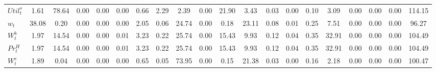 \begin{center}
\begin{longtable}{lccccccccccccccccccc}
$  Util^s_t                 $	 & 	                1.61	 & 	               78.64	 & 	                0.00	 & 	                0.00	 & 	                0.00	 & 	                0.66	 & 	                2.29	 & 	                2.39	 & 	                0.00	 & 	               21.90	 & 	                3.43	 & 	                0.03	 & 	                0.00	 & 	                0.10	 & 	                3.09	 & 	                0.00	 & 	                0.00	 & 	                0.00	 & 	              114.15 \\ 
$ w_t                       $	 & 	               38.08	 & 	                0.20	 & 	                0.00	 & 	                0.00	 & 	                0.00	 & 	                2.05	 & 	                0.06	 & 	               24.74	 & 	                0.00	 & 	                0.18	 & 	               23.11	 & 	                0.08	 & 	                0.01	 & 	                0.25	 & 	                7.51	 & 	                0.00	 & 	                0.00	 & 	                0.00	 & 	               96.27 \\ 
$ W^b_t                     $	 & 	                1.97	 & 	               14.54	 & 	                0.00	 & 	                0.00	 & 	                0.01	 & 	                3.23	 & 	                0.22	 & 	               25.74	 & 	                0.00	 & 	               15.43	 & 	                9.93	 & 	                0.12	 & 	                0.04	 & 	                0.35	 & 	               32.91	 & 	                0.00	 & 	                0.00	 & 	                0.00	 & 	              104.49 \\ 
$ Pr^H_t                    $	 & 	                1.97	 & 	               14.54	 & 	                0.00	 & 	                0.00	 & 	                0.01	 & 	                3.23	 & 	                0.22	 & 	               25.74	 & 	                0.00	 & 	               15.43	 & 	                9.93	 & 	                0.12	 & 	                0.04	 & 	                0.35	 & 	               32.91	 & 	                0.00	 & 	                0.00	 & 	                0.00	 & 	              104.49 \\ 
$ W^e_t                     $	 & 	                1.89	 & 	                0.04	 & 	                0.00	 & 	                0.00	 & 	                0.00	 & 	                0.65	 & 	                0.05	 & 	               73.95	 & 	                0.00	 & 	                0.15	 & 	               21.38	 & 	                0.03	 & 	                0.00	 & 	                0.16	 & 	                2.18	 & 	                0.00	 & 	                0.00	 & 	                0.00	 & 	              100.47 \\ 

\end{longtable}
\end{center}
